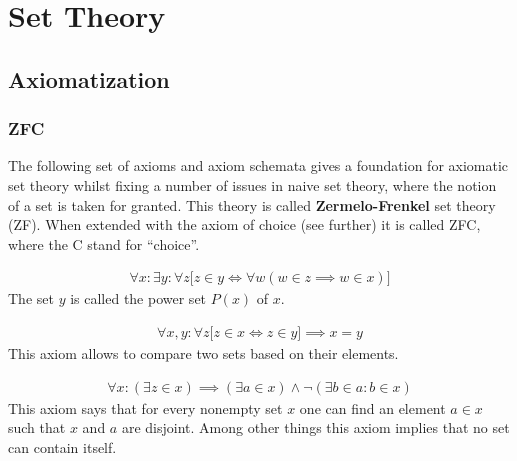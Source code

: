 \chapter{Set Theory}

\section{Axiomatization}\label{section:axiomatization}
\subsection{ZFC}

    The following set of axioms and axiom schemata gives a foundation for axiomatic set theory whilst fixing a number of issues in naive set theory, where the notion of a set is taken for granted. This theory is called \textbf{Zermelo-Frenkel} set theory (ZF). When extended with the axiom of choice (see further) it is called ZFC, where the C stand for ``choice''.

    \begin{axiom}\label{set:power_set_axiom}
        \begin{gather}
            \forall x:\exists y:\forall z\big[z\in y\iff\forall w(w\in z\implies w\in x)\big]
        \end{gather}
        The set $y$ is called the power set $P(x)$ of $x$.
    \end{axiom}

    \begin{axiom}[Extensionality]
        \begin{gather}
            \forall x,y:\forall z\big[z\in x\iff z\in y\big]\implies x=y
        \end{gather}
        This axiom allows to compare two sets based on their elements.
    \end{axiom}

    \begin{axiom}
        \begin{gather}
            \forall x:(\exists z\in x)\implies(\exists a\in x)\land\neg(\exists b\in a:b\in x)
        \end{gather}
        This axiom says that for every nonempty set $x$ one can find an element $a\in x$ such that $x$ and $a$ are disjoint. Among other things this axiom implies that no set can contain itself.
    \end{axiom}

